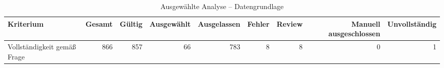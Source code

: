 \begin{table}[htbp]
\centering
\caption{Ausgewählte Analyse -- Datengrundlage}
\begin{tabular}{lrrrrrrrr}
\toprule
Kriterium & Gesamt & Gültig & Ausgewählt & Ausgelassen & Fehler & Review & Manuell ausgeschlossen & Unvollständig \\
\midrule
Vollständigkeit gemäß Frage & 866 & 857 & 66 & 783 & 8 & 8 & 0 & 1 \\
\bottomrule
\end{tabular}
\end{table}
